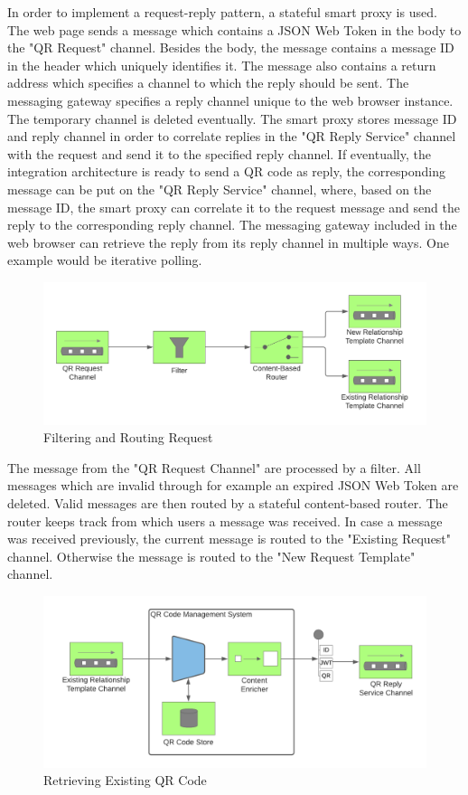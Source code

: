 \documentclass[
     12pt,         %
     a4paper,      %
     BCOR=10mm,version=first,     %
     DIV=14,version=first,        %
     ]{scrreprt}
\begin{document}
In order to implement a request-reply pattern, a stateful smart proxy is used. The web page sends a message which contains a JSON Web Token in the body to the "QR Request" channel. Besides the body, the message contains a message ID in the header which uniquely identifies it. The message also contains a return address which specifies a channel to which the reply should be sent. The messaging gateway specifies a reply channel unique to the web browser instance. The temporary channel is deleted eventually. The smart proxy stores message ID and reply channel in order to correlate replies in the "QR Reply Service" channel with the request and send it to the specified reply channel. If eventually, the integration architecture is ready to send a QR code as reply, the corresponding message can be put on the "QR Reply Service" channel, where, based on the message ID, the smart proxy can correlate it to the request message and send the reply to the corresponding reply channel. The messaging gateway included in the web browser can retrieve the reply from its reply channel in multiple ways. One example would be iterative polling.

\begin{figure}[h]
\caption{Filtering and Routing Request}
    \centering
    \includegraphics[scale=0.3]{Diagrams/Integration 1/Connection/Messaging 3.png}
\end{figure}

The message from the "QR Request Channel" are processed by a filter. All messages which are invalid through for example an expired JSON Web Token are deleted. Valid messages are then routed by a stateful content-based router. The router keeps track from which users a message was received. In case a message was received previously, the current message is routed to the "Existing Request" channel. Otherwise the message is routed to the "New Request Template" channel.

\begin{figure}[h]
\caption{Retrieving Existing QR Code}
    \centering
    \includegraphics[scale=0.3]{Diagrams/Integration 1/Connection/Messaging 4.png}
\end{figure}
\end{document}
